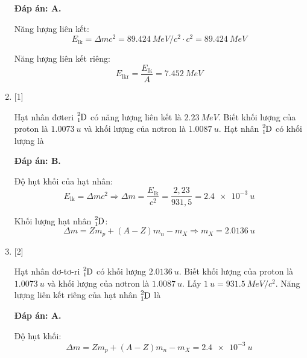 \begin{enumerate}[label=\bfseries Câu \arabic*:]
	\loigiai
	{		\textbf{Đáp án: A.}
		
		Năng lượng liên kết:
		$$E_\text{lk} = \Delta m c^2 = \SI{89.424}{MeV/c^2} \cdot c^2 = \SI{89.424}{MeV}$$
		
		Năng lượng liên kết riêng:
		$$E_\text{lkr} = \dfrac{E_\text{lk}}{A} = \SI{7.452}{MeV}$$
		
	}
	
	\item {} [1]
	
	\cauhoi
	{Hạt nhân đơteri $\ce{^2_1 D}$ có năng lượng liên kết là $\SI{2.23}{MeV}$. Biết khối lượng của proton là $\SI{1.0073}{u}$ và khối lượng của nơtron là $\SI{1.0087}{u}$. Hạt nhân $\ce{^2_1 D}$ có khối lượng là
	}
	
	\loigiai
	{		\textbf{Đáp án: B.}
		
		Độ hụt khối của hạt nhân:
		$$E_\text{lk} = \Delta m c^2 \Rightarrow \Delta m = \dfrac{E_\text{lk}}{c^2} = \dfrac{2,23}{931,5} = \SI{2.4e-3}{u}$$
		
		Khối lượng hạt nhân $\ce{^2_1 D}$:
		$$\Delta m = Zm_p + (A-Z)m_n - m_X \Rightarrow m_X = \SI{2.0136}{u}$$
	}
	

	
	\item {} [2]
	
	\cauhoi
	{Hạt nhân đơ-tơ-ri $\ce{^2_1 D}$ có khối lượng $\SI{2.0136}{u}$. Biết khối lượng của proton là $\SI{1.0073}{u}$ và khối lượng của nơtron là $\SI{1.0087}{u}$. Lấy $\SI{1}{u}=\SI{931.5}{MeV/c^2}$. Năng lượng liên kết riêng của hạt nhân $\ce{^2_1 D}$ là
	}
	
	\loigiai
	{		\textbf{Đáp án: A.}
		
		Độ hụt khối:
		$$\Delta m = Zm_p + (A-Z)m_n - m_X = \SI{2.4e-3}{u}$$
		
}
\end{enumerate}
